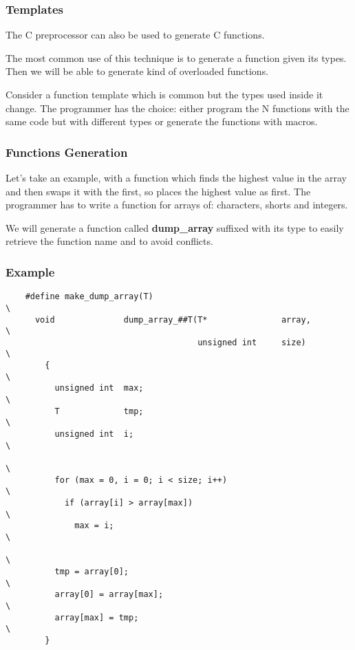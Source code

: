 {%

\begin{frame}
  \frametitle{Templates}

  The C preprocessor can also be used to generate C functions.

  \nl

  The most common use of this technique is to generate a function given
  its types. Then we will be able to generate kind of overloaded
  functions.

  \nl

  Consider a function template which is common but the types used inside
  it change. The programmer has the choice: either program the N functions
  with the same code but with different types or generate the functions
  with macros.
\end{frame}


\begin{frame}
  \frametitle{Functions Generation}

  Let's take an example, with a function which finds the highest value in
  the array and then swaps it with the first, so places the highest value
  as first. The programmer has to write a function for arrays of:
  characters, shorts and integers.

  \nl

  We will generate a function called \textbf{dump\_array} suffixed with
  its type to easily retrieve the function name and to avoid conflicts.
\end{frame}


\begin{frame}[containsverbatim]
  \frametitle{Example}

  \begin{verbatim}
    #define make_dump_array(T)                                          \
      void              dump_array_##T(T*               array,          \
                                       unsigned int     size)           \
        {                                                               \
          unsigned int  max;                                            \
          T             tmp;                                            \
          unsigned int  i;                                              \
                                                                        \
          for (max = 0, i = 0; i < size; i++)                           \
            if (array[i] > array[max])                                  \
              max = i;                                                  \
                                                                        \
          tmp = array[0];                                               \
          array[0] = array[max];                                        \
          array[max] = tmp;                                             \
        }


\end{verbatim}
\end{frame}}
